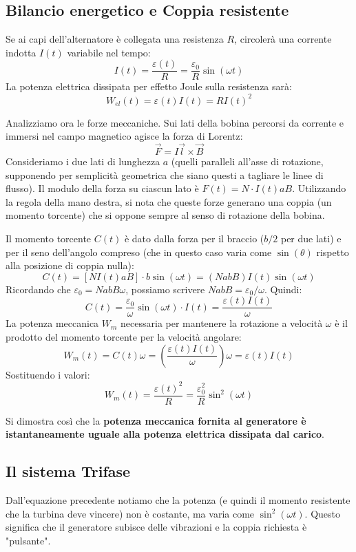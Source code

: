 \documentclass{book}
\begin{document}
\subsection{Bilancio energetico e Coppia resistente}
Se ai capi dell'alternatore è collegata una resistenza $R$, circolerà una corrente indotta $I(t)$ variabile nel tempo:
$$
I(t) = \frac{\varepsilon(t)}{R} = \frac{\varepsilon_0}{R} \sin(\omega t)
$$
La potenza elettrica dissipata per effetto Joule sulla resistenza sarà:
$$
W_{el}(t) = \varepsilon(t) I(t) = R I(t)^2
$$

Analizziamo ora le forze meccaniche. Sui lati della bobina percorsi da corrente e immersi nel campo magnetico agisce la forza di Lorentz:
$$
\vec{F} = I \vec{l} \times \vec{B}
$$
Consideriamo i due lati di lunghezza $a$ (quelli paralleli all'asse di rotazione, supponendo per semplicità geometrica che siano questi a tagliare le linee di flusso). Il modulo della forza su ciascun lato è $F(t) = N \cdot I(t) a B$.
Utilizzando la regola della mano destra, si nota che queste forze generano una coppia (un momento torcente) che si oppone sempre al senso di rotazione della bobina.

Il momento torcente $C(t)$ è dato dalla forza per il braccio ($b/2$ per due lati) e per il seno dell'angolo compreso (che in questo caso varia come $\sin(\theta)$ rispetto alla posizione di coppia nulla):
$$
C(t) = [N I(t) a B] \cdot b \sin(\omega t) = (NabB) I(t) \sin(\omega t)
$$
Ricordando che $\varepsilon_0 = NabB\omega$, possiamo scrivere $NabB = \varepsilon_0/\omega$. Quindi:
$$
C(t) = \frac{\varepsilon_0}{\omega} \sin(\omega t) \cdot I(t) = \frac{\varepsilon(t) I(t)}{\omega}
$$
La potenza meccanica $W_m$ necessaria per mantenere la rotazione a velocità $\omega$ è il prodotto del momento torcente per la velocità angolare:
$$
W_m(t) = C(t) \omega = \left( \frac{\varepsilon(t) I(t)}{\omega} \right) \omega = \varepsilon(t) I(t)
$$
Sostituendo i valori:
$$
W_m(t) = \frac{\varepsilon(t)^2}{R} = \frac{\varepsilon_0^2}{R} \sin^2(\omega t)
$$

Si dimostra così che la \textbf{potenza meccanica fornita al generatore è istantaneamente uguale alla potenza elettrica dissipata dal carico}.

\subsection{Il sistema Trifase}
Dall'equazione precedente notiamo che la potenza (e quindi il momento resistente che la turbina deve vincere) non è costante, ma varia come $\sin^2(\omega t)$. Questo significa che il generatore subisce delle vibrazioni e la coppia richiesta è "pulsante".
\end{document}
